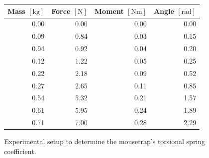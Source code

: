 \documentclass[a4paper]{article}
\begin{document}
\begin{figure}[h]
	\centering
	\begin{minipage}{0.35\textwidth}
		\centering
		\caption{Experimental setup to determine the mousetrap's torsional spring coefficient.}
	\end{minipage}
	\hspace{0.45cm}
	\begin{minipage}{0.55\textwidth}
		\centering
		\begin{tabular}{rrrr}
			\toprule
			Mass $[\si{\kilogram}]$ & Force $[\si{\newton}]$ & Moment $[\si{\newton\meter}]$ & Angle $[\si{\radian}]$ \\
			\midrule
			0.00 & 0.00 & 0.00 & 0.00 \\
			0.09 & 0.84 & 0.03 & 0.15 \\
			0.94 & 0.92 & 0.04 & 0.20 \\
			0.12 & 1.22 & 0.05 & 0.25 \\
			0.22 & 2.18 & 0.09 & 0.52 \\
			0.27 & 2.65 & 0.11 & 0.85 \\
			0.54 & 5.32 & 0.21 & 1.57 \\
			0.61 & 5.95 & 0.24 & 1.89 \\
			0.71 & 7.00 & 0.28 & 2.29 \\ 
			\bottomrule
		\end{tabular}
	\end{minipage}
\end{figure}
\end{document}
